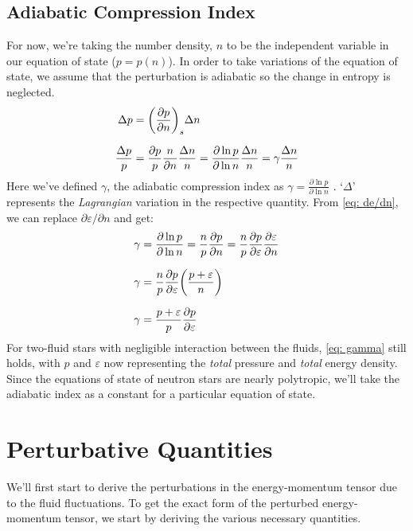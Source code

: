 \documentclass[a4paper,12pt,onehalfspacing]{report}
\begin{document}
\subsection{Adiabatic Compression Index}
For now, we're taking the number density, $n$ to be the independent variable in our equation of state ($p=p(n)$). In order to take variations of the equation of state, we assume that the perturbation is adiabatic so the change in entropy is neglected.
\begin{align*}
    \Delta p&= \qty(\pdv{p}{n})_s\Delta n\\[1.5ex]
    \frac{\Delta p}{p}&= \frac{\partial p}{p}\frac{n}{\partial n}\frac{\Delta n}{n}= \frac{\partial \ln p}{\partial \ln n}\frac{\Delta n}{n}= \gamma\frac{\Delta n}{n}
\end{align*}
Here we've defined $\gamma$, the adiabatic compression index as $\gamma= \frac{\partial \ln p}{\partial \ln n}$ \cite{Thorne_stellar_structure}. `$\Delta$' represents the \emph{Lagrangian} variation in the respective quantity. From \cref{eq: de/dn}, we can replace $\partial \varepsilon/ \partial n$ and get:
\begin{align}
    \gamma&= \frac{\partial \ln p}{\partial \ln n} = \frac{n}{p}\frac{\partial p}{\partial n}= \frac{n}{p}\frac{\partial p}{\partial \varepsilon}\frac{\partial \varepsilon}{\partial n}\nonumber\\[1.5ex]
    \gamma&= \frac{n}{p}\frac{\partial p}{\partial \varepsilon}\qty(\frac{p+\varepsilon}{n})\nonumber\\[1.5ex]
    \gamma&= \frac{p+\varepsilon}{p}\frac{\partial p}{\partial \varepsilon} \label{eq: gamma}
\end{align}
For two-fluid stars with negligible interaction between the fluids, \cref{eq: gamma} still holds, with $p$ and $\varepsilon$ now representing the \emph{total} pressure and \emph{total} energy density. Since the equations of state of neutron stars are nearly polytropic, we'll take the adiabatic index as a constant for a particular equation of state. 

\section{Perturbative Quantities}

We'll first start to derive the perturbations in the energy-momentum tensor due to the fluid fluctuations. To get the exact form of the perturbed energy-momentum tensor, we start by deriving the various necessary quantities. 
\end{document}
